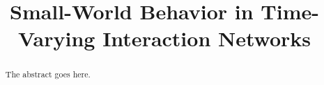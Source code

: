 \documentclass[conference]{IEEEtran}
\begin{document}
\title{Small-World Behavior in Time-Varying Interaction Networks}

\author{
}


% 

\maketitle

\begin{abstract}
The abstract goes here.
\end{abstract}


%
\IEEEpeerreviewmaketitle
\end{document}
